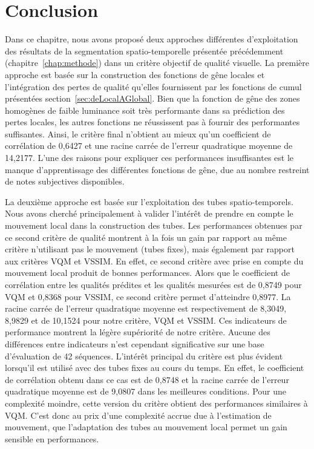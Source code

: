\section{Conclusion}
Dans ce chapitre, nous avons proposé deux approches différentes d'exploitation des résultats de la segmentation spatio-temporelle présentée précédemment (chapitre~\ref{chap:methode}) dans un critère objectif de qualité visuelle. La première approche est basée sur la construction des fonctions de gêne locales et l'intégration des pertes de qualité qu'elles fournissent par les fonctions de cumul présentées section~\ref{sec:deLocalAGlobal}. Bien que la fonction de gêne des zones homogènes de faible luminance soit très performante dans sa prédiction des pertes locales, les autres fonctions ne réussissent pas à fournir des performantes suffisantes. Ainsi, le critère final n'obtient au mieux qu'un coefficient de corrélation de 0,6427 et une racine carrée de l'erreur quadratique moyenne de 14,2177. L'une des raisons pour expliquer ces performances insuffisantes est le manque d'apprentissage des différentes fonctions de gêne, due au nombre restreint de notes subjectives disponibles. %

La deuxième approche est basée sur l'exploitation des tubes spatio-temporels. Nous avons cherché principalement à valider l'intérêt de prendre en compte le mouvement local dans la construction des tubes. Les performances obtenues par ce second critère de qualité montrent à la fois un gain par rapport au même critère n'utilisant pas le mouvement (tubes fixes), mais également par rapport aux critères VQM et VSSIM. En effet, ce second critère avec prise en compte du mouvement local produit de bonnes performances. Alors que le coefficient de corrélation entre les qualités prédites et les qualités mesurées est de 0,8749 pour VQM et 0,8368 pour VSSIM, ce second critère permet d'atteindre 0,8977. La racine carrée de l'erreur quadratique moyenne est respectivement de 8,3049, 8,9829 et de 10,1524 pour notre critère, VQM et VSSIM. Ces indicateurs de performance montrent la légère supériorité de notre critère. Aucune des différences entre indicateurs n'est cependant significative sur une base d'évaluation de 42 séquences. L'intérêt principal du critère est plus évident lorsqu'il est utilisé avec des tubes fixes au cours du temps. En effet, le coefficient de corrélation obtenu dans ce cas est de 0,8748 et la racine carrée de l'erreur quadratique moyenne est de 9,0807 dans les meilleures conditions. Pour une complexité moindre, cette version du critère obtient des performances similaires à VQM. C'est donc au prix d'une complexité accrue due à l'estimation de mouvement, que l'adaptation des tubes au mouvement local permet un gain sensible en performances.

\ornementChapitre
